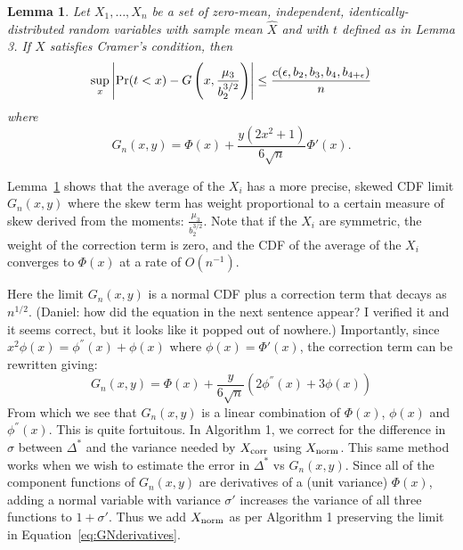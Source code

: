 \documentclass{article}
\newtheorem{lemma}{Lemma}
\begin{document}
\begin{lemma}\label{lem:clt_edgeworth}
Let $X_1,\ldots,X_n$ be a set of zero-mean, independent, identically-distributed
random variables with sample mean $\hat{X}$ and with $t$ defined as in Lemma 3.
If $X$ satisfies Cramer's condition, then
\begin{equation}\label{eq:clt-bounds_edgeworth}
    \sup_x\left|{\rm Pr}(t<x) - G\left(x, \frac{\mu_3}{b_2^{3/2}}\right)\right| \leq \frac{c(\epsilon,b_2,b_3,b_4,b_{4+\epsilon})}{n}
\end{equation}
where
\begin{equation}
    G_n(x,y) = \Phi(x) + \frac{y(2x^2+1)}{6\sqrt{n}}\Phi'(x).
\end{equation}
\end{lemma}

Lemma~\ref{lem:clt_edgeworth} shows that the average of the $X_i$ has a more
precise, skewed CDF limit $G_n(x,y)$ where the skew term has weight proportional
to a certain measure of skew derived from the moments:
$\frac{\mu_3}{b_2^{3/2}}$. Note that if the $X_i$ are symmetric, the weight of
the correction term is zero, and the CDF of the average of the $X_i$ converges
to $\Phi(x)$ at a rate of $O(n^{-1})$.

Here the limit $G_n(x,y)$ is a normal CDF plus a correction term that decays as
$n^{1/2}$. {\color{blue} (Daniel: how did the equation in the next sentence
appear? I verified it and it seems correct, but it looks like it popped out of
nowhere.)} Importantly, since $x^2\phi(x) = \phi^{''}(x) + \phi(x)$ where
$\phi(x)=\Phi'(x)$, the correction term can be rewritten giving:
\begin{equation}\label{eq:GNderivatives}
    G_n(x,y) = \Phi(x) + \frac{y}{6\sqrt{n}}(2\phi^{''}(x)+3\phi(x))
\end{equation}
From which we see that $G_n(x,y)$ is a linear combination of $\Phi(x)$,
$\phi(x)$ and $\phi^{''}(x)$. This is quite fortuitous. In Algorithm 1, we
correct for the difference in $\sigma$ between $\Delta^*$ and the variance
needed by $X_{\rm corr}$ using $X_{\rm norm}$. This same method works when we
wish to estimate the error in $\Delta^*$ vs $G_n(x,y)$. Since all of the
component functions of $G_n(x,y)$ are derivatives of a (unit variance)
$\Phi(x)$, adding a normal variable with variance $\sigma'$ increases the
variance of all three functions to $1+\sigma'$. Thus we add $X_{\rm norm}$ as
per Algorithm 1 preserving the limit in Equation~\ref{eq:GNderivatives}.
\end{document}
